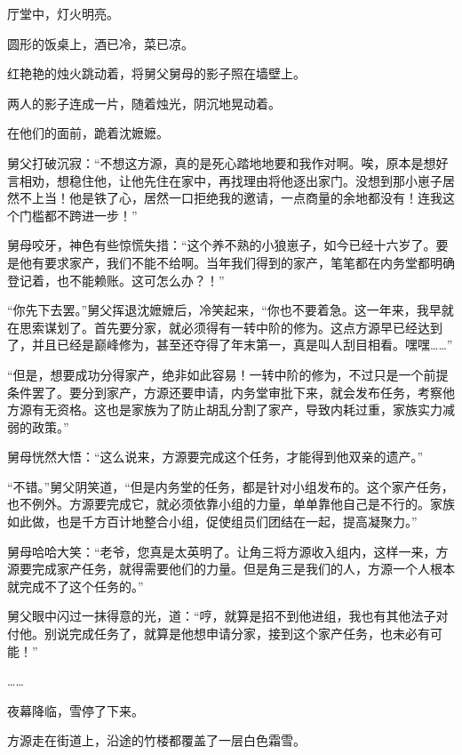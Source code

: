 
\begin{this_body}

厅堂中，灯火明亮。

圆形的饭桌上，酒已冷，菜已凉。

红艳艳的烛火跳动着，将舅父舅母的影子照在墙壁上。

两人的影子连成一片，随着烛光，阴沉地晃动着。

在他们的面前，跪着沈嬷嬷。

舅父打破沉寂：“不想这方源，真的是死心踏地地要和我作对啊。唉，原本是想好言相劝，想稳住他，让他先住在家中，再找理由将他逐出家门。没想到那小崽子居然不上当！他是铁了心，居然一口拒绝我的邀请，一点商量的余地都没有！连我这个门槛都不跨进一步！”

舅母咬牙，神色有些惊慌失措：“这个养不熟的小狼崽子，如今已经十六岁了。要是他有要求家产，我们不能不给啊。当年我们得到的家产，笔笔都在内务堂都明确登记着，也不能赖账。这可怎么办？！”

“你先下去罢。”舅父挥退沈嬷嬷后，冷笑起来，“你也不要着急。这一年来，我早就在思索谋划了。首先要分家，就必须得有一转中阶的修为。这点方源早已经达到了，并且已经是巅峰修为，甚至还夺得了年末第一，真是叫人刮目相看。嘿嘿……”

“但是，想要成功分得家产，绝非如此容易！一转中阶的修为，不过只是一个前提条件罢了。要分到家产，方源还要申请，内务堂审批下来，就会发布任务，考察他方源有无资格。这也是家族为了防止胡乱分割了家产，导致内耗过重，家族实力减弱的政策。”

舅母恍然大悟：“这么说来，方源要完成这个任务，才能得到他双亲的遗产。”

“不错。”舅父阴笑道，“但是内务堂的任务，都是针对小组发布的。这个家产任务，也不例外。方源要完成它，就必须依靠小组的力量，单单靠他自己是不行的。家族如此做，也是千方百计地整合小组，促使组员们团结在一起，提高凝聚力。”

舅母哈哈大笑：“老爷，您真是太英明了。让角三将方源收入组内，这样一来，方源要完成家产任务，就得需要他们的力量。但是角三是我们的人，方源一个人根本就完成不了这个任务的。”

舅父眼中闪过一抹得意的光，道：“哼，就算是招不到他进组，我也有其他法子对付他。别说完成任务了，就算是他想申请分家，接到这个家产任务，也未必有可能！”

……

夜幕降临，雪停了下来。

方源走在街道上，沿途的竹楼都覆盖了一层白色霜雪。


\end{this_body}

